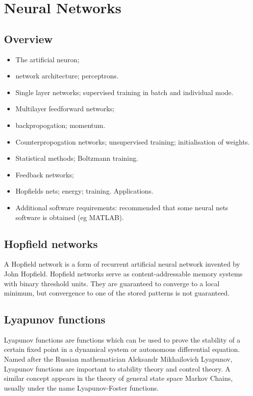 \documentclass[a4paper,11pt]{report}
\begin{document}
\chapter{Neural Networks}
\section{Overview}
\begin{itemize}
\item The artificial neuron; \item network architecture;
perceptrons. \item Single layer networks; supervised training in
batch and individual mode. \item Multilayer feedforward networks;
\item backpropogation; momentum. \item Counterpropogation
networks; unsupervised training; initialisation of weights. \item
Statistical methods; Boltzmann training. \item Feedback networks;
\item Hopfields nets; energy; training. Applications. \item
Additional software requirements: recommended that some neural
nets software is obtained (eg MATLAB).
\end{itemize}


\section{Hopfield networks}
A Hopfield network is a form of recurrent artificial neural
network invented by John Hopfield. Hopfield networks serve as
content-addressable memory systems with binary threshold units.
They are guaranteed to converge to a local minimum, but
convergence to one of the stored patterns is not guaranteed.


\section{Lyapunov functions}
Lyapunov functions are functions which can be used to prove the
stability of a certain fixed point in a dynamical system or
autonomous differential equation. Named after the Russian
mathematician Aleksandr Mikhailovich Lyapunov, Lyapunov functions
are important to stability theory and control theory. A similar
concept appears in the theory of general state space Markov
Chains, usually under the name Lyapunov-Foster functions.
\end{document}
